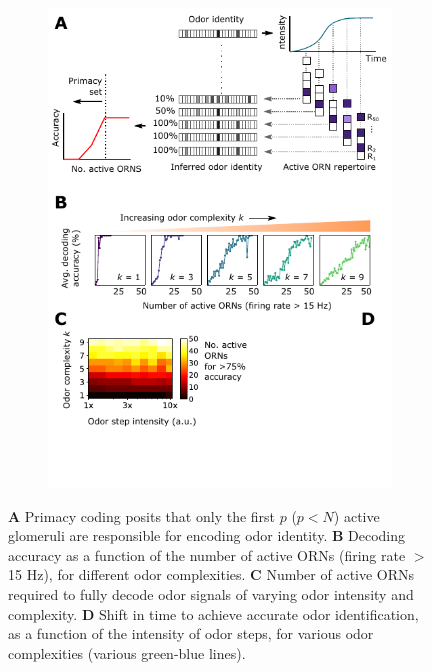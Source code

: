 \documentclass[9pt,twocolumn,twoside,lineno]{pnas-new}
\begin{document}
\begin{figure}[!tb]
	\begin{subfigure}[t]{\linewidth}
		\includegraphics[width=\textwidth]{figures/4_primacy_coding}
		\label{fig:primacy_coding_a}	
	\end{subfigure}
	\begin{subfigure}[t]{0\linewidth}
		\label{fig:primacy_coding_b}
	\end{subfigure}
	\begin{subfigure}[t]{0\linewidth}
		\label{fig:primacy_coding_c}
	\end{subfigure}
	\begin{subfigure}[t]{0\linewidth}
		\label{fig:primacy_coding_d}
	\end{subfigure}
	\caption{\footnotesize{\textbf{A} Primacy coding posits that only the first $p$ ($p < N$) active glomeruli are responsible for encoding odor identity. \textbf{B} Decoding accuracy as a function of the number of active ORNs (firing rate $>$ 15 Hz), for different odor complexities. \textbf{C} Number of active ORNs required to fully decode odor signals of varying odor intensity and complexity. \textbf{D} Shift in time to achieve accurate odor identification, as a function of the intensity of odor steps, for various odor complexities (various green-blue lines).
	}}
	\label{fig:primacy_coding}
\end{figure}
\end{document}

